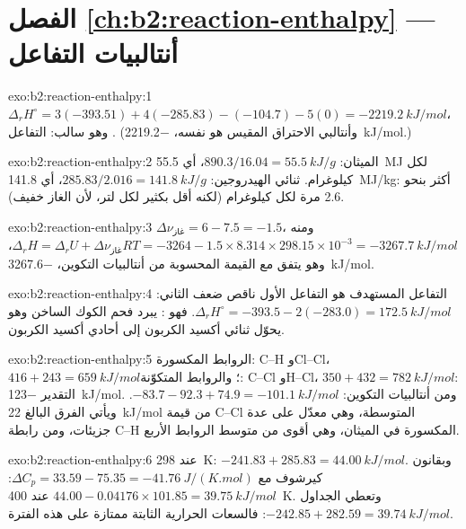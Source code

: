 \section*{الفصل \ref{ch:b2:reaction-enthalpy} --- أنتالبيات التفاعل}

\begin{solution}{exo:b2:reaction-enthalpy:1}
$\Delta_r H^\circ = 3(-393.51) + 4(-285.83) - (-104.7) - 5(0) =
\qty{-2219.2}{kJ/mol}$، وهو سالب: التفاعل . (وأنتالبي الاحتراق
المقيس هو نفسه، \qty{-2219.2}{kJ/mol}.)
\end{solution}

\begin{solution}{exo:b2:reaction-enthalpy:2}
الميثان: $890.3/16.04 = \qty{55.5}{kJ/g}$، أي \qty{55.5}{MJ} لكل كيلوغرام.
ثنائي الهيدروجين: $285.83/2.016 = \qty{141.8}{kJ/g}$،
أي \qty{141.8}{MJ/kg}: أكثر بنحو 2.6 مرة لكل كيلوغرام (لكنه أقل بكثير لكل
لتر، لأن الغاز خفيف).
\end{solution}

\begin{solution}{exo:b2:reaction-enthalpy:3}
$\Delta\nu_{\text{غاز}} = 6 - 7.5 = -1.5$، ومنه $\Delta_r H = \Delta_r U +
\Delta\nu_{\text{غاز}}RT = -3264 - 1.5 \times 8.314 \times 298.15 \times
10^{-3} = \qty{-3267.7}{kJ/mol}$، وهو يتفق مع القيمة المحسوبة من أنتالبيات
التكوين، \qty{-3267.6}{kJ/mol}.
\end{solution}

\begin{solution}{exo:b2:reaction-enthalpy:4}
التفاعل المستهدف هو التفاعل الأول ناقص ضعف الثاني:
$\Delta_r H^\circ = -393.5 - 2(-283.0) = \qty{+172.5}{kJ/mol}$. فهو : يبرد فحم الكوك الساخن وهو يحوّل ثنائي أكسيد الكربون إلى أحادي
أكسيد الكربون.
\end{solution}

\begin{solution}{exo:b2:reaction-enthalpy:5}
الروابط المكسورة: C--H وCl--Cl، $416 + 243 = \qty{659}{kJ/mol}$؛ والروابط
المتكوّنة: C--Cl وH--Cl، $350 + 432 = \qty{782}{kJ/mol}$: التقدير
\qty{-123}{kJ/mol}. ومن أنتالبيات التكوين: $-83.7 - 92.3 + 74.9 =
\qty{-101.1}{kJ/mol}$. ويأتي الفرق البالغ \qty{22}{kJ/mol} من قيمة C--Cl
المتوسطة، وهي معدّل على عدة جزيئات، ومن رابطة C--H المكسورة في الميثان،
وهي أقوى من متوسط الروابط الأربع.
\end{solution}

\begin{solution}{exo:b2:reaction-enthalpy:6}
عند \qty{298}{K}: $-241.83 + 285.83 = \qty{44.00}{kJ/mol}$. وبقانون كيرشوف مع
$\Delta C_p = 33.59 - 75.35 = \qty{-41.76}{J/(K.mol)}$:
$44.00 - 0.04176 \times 101.85 = \qty{39.75}{kJ/mol}$ عند \qty{400}{K}. وتعطي
الجداول $-242.85 + 282.59 = \qty{39.74}{kJ/mol}$: فالسعات الحرارية الثابتة
ممتازة على هذه الفترة.
\end{solution}

